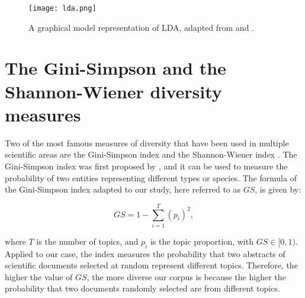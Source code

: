 \begin{figure}[!ht]
	\centering
	\texttt{[image: lda.png]}
	\caption{A graphical model representation of LDA, adapted from \cite{blei_latent_2003} and \cite{blei_topic_2009}.}
	\label{fig:lda}
\end{figure}

%
%

\section{The Gini-Simpson and the Shannon-Wiener diversity measures} \label{diversity_indices}

Two of the most famous measures of diversity that have been used in multiple scientific areas are the Gini-Simpson index and the Shannon-Wiener index \citep{jost_entropy_2006}. The Gini-Simpson index was first proposed by \cite{simpson_measurement_1949}, and it can be used to measure the probability of two entities representing different types or species. The formula of the Gini-Simpson index adapted to our study, here referred to as $GS$, is given by:

\begin{equation}
GS = 1 - \sum^{T}_{i = 1} (p_{i})^{2},
\label{gs_entropy}
\end{equation}

\noindent where $T$ is the number of topics, and $p_{i}$ is the topic proportion, with $GS \in [0,1)$. Applied to our case, the index measures the probability that two abstracts of scientific documents selected at random represent different topics. Therefore, the higher the value of $GS$, the more diverse our corpus is because the higher the probability that two documents randomly selected are from different topics.

